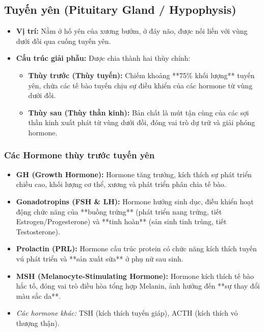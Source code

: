 \subsection{Tuyến yên (Pituitary Gland / Hypophysis)}
\begin{itemize}
    \item \textbf{Vị trí:} Nằm ở hố yên của xương bướm, ở đáy não, được nối liền với vùng dưới đồi qua cuống tuyến yên.
    \item \textbf{Cấu trúc giải phẫu:} Được chia thành hai thùy chính:
    \begin{itemize}
        \item \textbf{Thùy trước (Thùy tuyến):} Chiếm khoảng **75\% khối lượng** tuyến yên, chứa các tế bào tuyến chịu sự điều khiển của các hormone từ vùng dưới đồi.
        \item \textbf{Thùy sau (Thùy thần kinh):} Bản chất là mút tận cùng của các sợi thần kinh xuất phát từ vùng dưới đồi, đóng vai trò dự trữ và giải phóng hormone.
    \end{itemize}
\end{itemize}

\subsubsection{Các Hormone thùy trước tuyến yên}
\begin{itemize}
    \item \textbf{GH (Growth Hormone):} Hormone tăng trưởng, kích thích sự phát triển chiều cao, khối lượng cơ thể, xương và phát triển phân chia tế bào.
    \item \textbf{Gonadotropins (FSH \& LH):} Hormone hướng sinh dục, điều khiển hoạt động chức năng của **buồng trứng** (phát triển nang trứng, tiết Estrogen/Progesterone) và **tinh hoàn** (sản sinh tinh trùng, tiết Testosterone).
    \item \textbf{Prolactin (PRL):} Hormone cấu trúc protein có chức năng kích thích tuyến vú phát triển và **sản xuất sữa** ở phụ nữ sau sinh.
    \item \textbf{MSH (Melanocyte-Stimulating Hormone):} Hormone kích thích tế bào hắc tố, đóng vai trò điều hòa tổng hợp Melanin, ảnh hưởng đến **sự thay đổi màu sắc da**.
    \item \textit{Các hormone khác:} TSH (kích thích tuyến giáp), ACTH (kích thích vỏ thượng thận).
\end{itemize}

